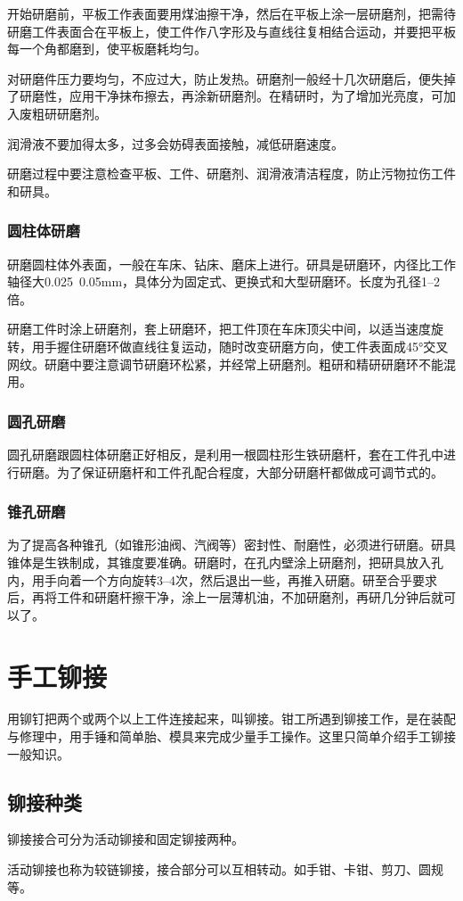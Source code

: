 \documentclass{ctexbook}
\begin{document}
开始研磨前，平板工作表面要用煤油擦干净，然后在平板上涂一层研磨剂，把需待研磨工件表面合在平板上，使工件作八字形及与直线往复相结合运动，并要把平板每一个角都磨到，使平板磨耗均匀。

对研磨件压力要均匀，不应过大，防止发热。研磨剂一般经十几次研磨后，便失掉了研磨性，应用干净抹布擦去，再涂新研磨剂。在精研时，为了增加光亮度，可加入废粗研研磨剂。

润滑液不要加得太多，过多会妨碍表面接触，减低研磨速度。

研磨过程中要注意检查平板、工件、研磨剂、润滑液清洁程度，防止污物拉伤工件和研具。
\subsubsection{圆柱体研磨}
研磨圆柱体外表面，一般在车床、钻床、磨床上进行。研具是研磨环，内径比工作轴径大0.025~0.05mm，具体分为固定式、更换式和大型研磨环。长度为孔径1--2倍。

研磨工件时涂上研磨剂，套上研磨环，把工件顶在车床顶尖中间，以适当速度旋转，用手握住研磨环做直线往复运动，随时改变研磨方向，使工件表面成45°交叉网纹。研磨中要注意调节研磨环松紧，并经常上研磨剂。粗研和精研研磨环不能混用。
\subsubsection{圆孔研磨}
圆孔研磨跟圆柱体研磨正好相反，是利用一根圆柱形生铁研磨杆，套在工件孔中进行研磨。为了保证研磨杆和工件孔配合程度，大部分研磨杆都做成可调节式的。
\subsubsection{锥孔研磨}
为了提高各种锥孔（如锥形油阀、汽阀等）密封性、耐磨性，必须进行研磨。研具锥体是生铁制成，其锥度要准确。研磨时，在孔内壁涂上研磨剂，把研具放入孔内，用手向着一个方向旋转3--4次，然后退出一些，再推入研磨。研至合乎要求后，再将工件和研磨杆擦干净，涂上一层薄机油，不加研磨剂，再研几分钟后就可以了。
\section{手工铆接}
用铆钉把两个或两个以上工件连接起来，叫铆接。钳工所遇到铆接工作，是在装配与修理中，用手锤和简单胎、模具来完成少量手工操作。这里只简单介绍手工铆接一般知识。
\subsection{铆接种类}
铆接接合可分为活动铆接和固定铆接两种。

活动铆接也称为较链铆接，接合部分可以互相转动。如手钳、卡钳、剪刀、圆规等。
\end{document}

